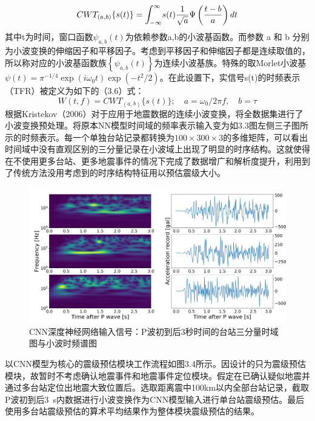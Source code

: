 \begin{equation}
C W T_{(a, b)}\{s(t)\}=\mathlarger{\int}_{-\infty}^{\infty} s(t) \frac{1}{\sqrt{a}} \Psi\left(\frac{t-b}{a}\right) d t
\end{equation}
其中t为时间，窗口函数$\psi_{a, b}(t)$为依赖参数a,b的小波基函数。而参数 a 和 b 分别为小波变换的伸缩因子和平移因子。考虑到平移因子和伸缩因子都是连续取值的，所以称对应的小波基函数族$\left\{\psi_{a, b}(t)\right\}$为连续小波基族。特殊的取Morlet小波基$\psi(t)=\pi^{-1 / 4} \exp \left(i \omega_{0} t\right) \exp \left(-t^{2} / 2\right)$。在此设置下，实信号s(t)的时频表示（TFR）被定义为如下的（3.6）式：\
\begin{equation}
W(t, f)=C W T_{(a, b)}\{s(t)\} ; \quad a=\omega_{0} / 2 \pi f,\quad  b=\tau
\end{equation}
\indent 根据Kristekov（2006）对于应用于地震数据的连续小波变换，将全数据集进行了小波变换预处理。将原本NN模型时间域的频率表示输入变为如3.3图左侧三子图所示的时频表示。每一个单独台站记录都转换为$100\times 300\times 3$的多维矩阵，可以看出时间域中没有直观区别的三分量记录在小波域上出现了明显的时序结构。这就使得在不使用更多台站、更多地震事件的情况下完成了数据增广和解析度提升，利用到了传统方法没用考虑到的时序结构特征用以预估震级大小。\\
 \begin{figure}[!h]%
	\centering  %
	\includegraphics[width=\linewidth]{img/wavelet.jpg}  %
	\caption{CNN深度神经网络输入信号：P波初到后3秒时间的台站三分量时域图与小波时频谱图}  %
	\label{fig:mcmthesis-logo}   %
\end{figure}
\indent 以CNN模型为核心的震级预估模块工作流程如图3.4所示。因设计的只为震级预估模块，故暂时不考虑确认地震事件和地震事件定位模块。假定在已确认疑似地震并通过多台站定位出地震大致位置后。选取距离震中100km以内全部台站记录，截取P波初到后3~s内数据进行小波变换作为CNN模型输入进行单台站震级预估。最后使用多台站震级预估的算术平均结果作为整体模块震级预估的结果。\\
